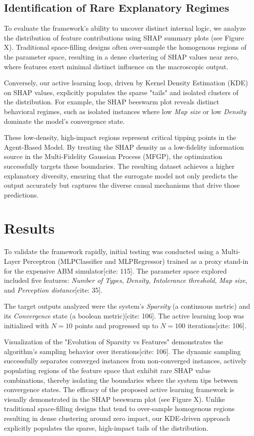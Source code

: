\documentclass[sn-mathphys]{sn-jnl}
\theoremstyle{thmstyleone}%
\theoremstyle{thmstyletwo}%
\theoremstyle{thmstylethree}%
\begin{document}
\subsection{Identification of Rare Explanatory Regimes}

To evaluate the framework's ability to uncover distinct internal logic, we analyze the distribution of feature contributions using SHAP summary plots (see Figure X). Traditional space-filling designs often over-sample the homogenous regions of the parameter space, resulting in a dense clustering of SHAP values near zero, where features exert minimal distinct influence on the macroscopic output.

Conversely, our active learning loop, driven by Kernel Density Estimation (KDE) on SHAP values, explicitly populates the sparse "tails" and isolated clusters of the distribution. For example, the SHAP beeswarm plot reveals distinct behavioral regimes, such as isolated instances where low \textit{Map size} or low \textit{Density} dominate the model's convergence state. 

These low-density, high-impact regions represent critical tipping points in the Agent-Based Model. By treating the SHAP density as a low-fidelity information source in the Multi-Fidelity Gaussian Process (MFGP), the optimization successfully targets these boundaries. The resulting dataset achieves a higher explanatory diversity, ensuring that the surrogate model not only predicts the output accurately but captures the diverse causal mechanisms that drive those predictions.
\section{Results}
To validate the framework rapidly, initial testing was conducted using a Multi-Layer Perceptron (MLPClassifier and MLPRegressor) trained as a proxy stand-in for the expensive ABM simulator[cite: 115]. The parameter space explored included five features: \textit{Number of Types}, \textit{Density}, \textit{Intolerance threshold}, \textit{Map size}, and \textit{Perception distance}[cite: 35]. 

The target outputs analyzed were the system's \textit{Sparsity} (a continuous metric) and its \textit{Convergence} state (a boolean metric)[cite: 106]. The active learning loop was initialized with $N=10$ points and progressed up to $N=100$ iterations[cite: 106]. 

Visualization of the "Evolution of Sparsity vs Features" demonstrates the algorithm's sampling behavior over iterations[cite: 106]. The dynamic sampling successfully separates converged instances from non-converged instances, actively populating regions of the feature space that exhibit rare SHAP value combinations, thereby isolating the boundaries where the system tips between convergence states.
The efficacy of the proposed active learning framework is visually demonstrated in the SHAP beeswarm plot (see Figure X). Unlike traditional space-filling designs that tend to over-sample homogenous regions resulting in dense clustering around zero impact, our KDE-driven approach explicitly populates the sparse, high-impact tails of the distribution.
\end{document}
